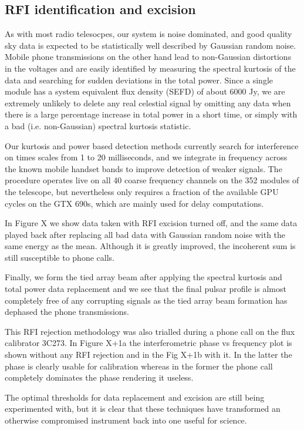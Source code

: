 \subsection{RFI identification and excision}

As with most radio telesocpes, our system is noise dominated, and good quality sky data is expected to be statistically well described by Gaussian random noise. Mobile phone transmissions on the other hand lead to non-Gaussian distortions in the voltages and are easily identified by measuring the spectral kurtosis of the data and searching for sudden deviations in the total power. Since a single module has a system equivalent flux density (SEFD) of about 6000 Jy, we are extremely unlikely to delete any real celestial signal by omitting any data when there is a large percentage increase in total power in a short time, or simply with a bad (i.e. non-Gaussian) spectral kurtosis statistic. 

Our kurtosis and power based detection methods currently search for interference on times scales from 1 to 20 milliseconds, and we integrate in frequency across the known mobile handset bands to improve detection of weaker signals. The procedure operates live on all 40 coarse frequency channels on the 352 modules of the telescope, but nevertheless only requires a fraction of the available GPU cycles on the GTX 690s, which are mainly used for delay computations. 

In Figure X we show data taken with RFI excision turned off, and the same data played back after replacing all bad data with Gaussian random noise with the same energy as the mean. Although it is greatly improved, the incoherent sum is still susceptible to phone calls.

Finally, we form the tied array beam after applying the spectral kurtosis and total power data replacement and we see that the final pulsar profile is almost completely free of any corrupting signals as the tied array beam formation has dephased the phone transmissions.

This RFI rejection methodology was also trialled during a phone call on the flux calibrator 3C273. In Figure X+1a the interferometric phase vs frequency plot is shown without any RFI rejection and in the Fig X+1b with it. In the latter the phase is clearly usable for calibration whereas in the former the phone call completely dominates the phase rendering it useless.

The optimal thresholds for data replacement and excision are still being experimented with, but it is clear that these techniques have transformed an otherwise compromised instrument back into one useful for science.


  
  